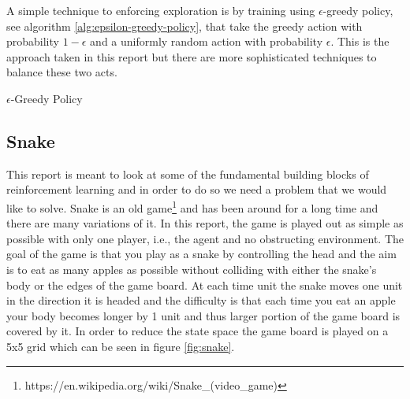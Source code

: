 \documentclass[result.tex]{subfiles}
\begin{document}
    A simple technique to enforcing exploration is by training using $\epsilon$-greedy policy, see algorithm \ref{alg:epsilon-greedy-policy}, that take the greedy action with probability $1 - \epsilon$ and a uniformly random action with probability $\epsilon$. This is the approach taken in this report but there are more sophisticated techniques to balance these two acts.

    \begin{algorithm}[H]
        \caption{$\epsilon$-Greedy Policy}
        \label{alg:epsilon-greedy-policy}
        \begin{algorithmic}[1]
            \Statex
            \Else
            \EndIf
            \State
            \EndFunction
        \end{algorithmic}
    \end{algorithm}

    \subsection*{Snake}

    This report is meant to look at some of the fundamental building blocks of reinforcement learning and in order to do so we need a problem that we would like to solve. Snake is an old game\footnote{https://en.wikipedia.org/wiki/Snake\_(video\_game)} and has been around for a long time and there are many variations of it. In this report, the game is played out as simple as possible with only one player, i.e., the agent and no obstructing environment. The goal of the game is that you play as a snake by controlling the head and the aim is to eat as many apples as possible without colliding with either the snake's body or the edges of the game board. At each time unit the snake moves one unit in the direction it is headed and the difficulty is that each time you eat an apple your body becomes longer by 1 unit and thus larger portion of the game board is covered by it. In order to reduce the state space the game board is played on a 5x5 grid which can be seen in figure \ref{fig:snake}.
\end{document}
